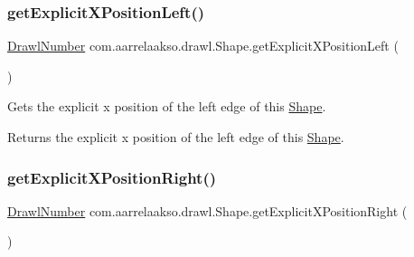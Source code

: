 \subsubsection{\texorpdfstring{get\+Explicit\+X\+Position\+Left()}{getExplicitXPositionLeft()}}
{\footnotesize\ttfamily \hyperlink{classcom_1_1aarrelaakso_1_1drawl_1_1_drawl_number}{Drawl\+Number} com.\+aarrelaakso.\+drawl.\+Shape.\+get\+Explicit\+X\+Position\+Left (\begin{DoxyParamCaption}{ }\end{DoxyParamCaption})\hspace{0.3cm}{\ttfamily [protected]}}



Gets the explicit x position of the left edge of this \hyperlink{classcom_1_1aarrelaakso_1_1drawl_1_1_shape}{Shape}. 

\begin{DoxyReturn}{Returns}
the explicit x position of the left edge of this \hyperlink{classcom_1_1aarrelaakso_1_1drawl_1_1_shape}{Shape}. 
\end{DoxyReturn}
\mbox{\label{classcom_1_1aarrelaakso_1_1drawl_1_1_shape_a19970b658b55e4e61de31aaaef8cf7fe}} 
\subsubsection{\texorpdfstring{get\+Explicit\+X\+Position\+Right()}{getExplicitXPositionRight()}}
{\footnotesize\ttfamily \hyperlink{classcom_1_1aarrelaakso_1_1drawl_1_1_drawl_number}{Drawl\+Number} com.\+aarrelaakso.\+drawl.\+Shape.\+get\+Explicit\+X\+Position\+Right (\begin{DoxyParamCaption}{ }\end{DoxyParamCaption})\hspace{0.3cm}{\ttfamily [protected]}}

\mbox{\label{classcom_1_1aarrelaakso_1_1drawl_1_1_shape_aa26eb0263851ed8f8221bf3740e6e584}} 
